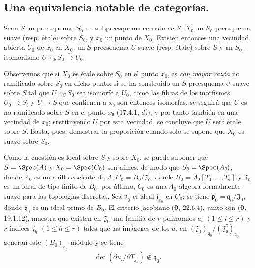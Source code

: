 \subsection{Una equivalencia notable de categorías.}
\label{subsection:IV.18.1}

\begin{proposition}[18.1.1]
\label{IV.18.1.1}
Sean $S$ un preesquema, $S_0$ un subpreesquema cerrado de $S$, $X_0$ un $S_0$-preesquema suave \textup{(resp.} étale\textup{)} sobre $S_0$, y $x_0$ un punto de $X_0$. Existen entonces una vecindad abierta $U_0$ de $x_0$ en $X_0$, un $S$-preesquema $U$ suave \textup{(resp.} étale\textup{)} sobre $S$ y un $S_0$-isomorfismo
$U\times_S S_0\xrightarrow{\sim}U_0$.
\end{proposition}

Observemos que si $X_0$ es étale sobre $S_0$ en el punto $x_0$, es \emph{con mayor razón} no ramificado sobre $S_0$ en dicho punto; si se ha construido un $S$-preesquema $U$ suave sobre $S$ tal que $U\times_S S_0$ sea isomorfo a $U_0$, como las fibras de los morfismos $U_0\to S_0$ y $U\to S$ que contienen a $x_0$ son entonces isomorfas, se seguirá que $U$ es no ramificado sobre $S$ en el punto $x_0$ (17.4.1, \emph{d)}), y por tanto también en una vecindad de $x_0$; sustituyendo $U$ por esta vecindad, se concluye que $U$ será étale sobre $S$. Basta, pues, demostrar la proposición cuando solo se supone que $X_0$ es suave sobre $S_0$.

Como la cuestión es local sobre $S$ y sobre $X_0$, se puede suponer que $S=\Spec(A)$ y $X_0=\Spec(C_0)$ son afines, de modo que $S_0=\Spec(A_0)$, donde $A_0$ es un anillo cociente de $A$, $C_0=B_0/\mathfrak J_0$, donde $B_0=A_0[T_1,\ldots,T_n]$ y $\mathfrak J_0$ es un ideal de tipo finito de $B_0$; por último, $C_0$ es una $A_0$-álgebra formalmente suave para las topologías discretas. Sea $\mathfrak p_0$ el ideal $\mathfrak j_{x_0}$ en $C_0$; se tiene $\mathfrak p_0=\mathfrak q_0/\mathfrak J_0$, donde $\mathfrak q_0$ es un ideal primo de $B_0$. El criterio jacobiano (\textbf 0, 22.6.4), junto con (\textbf 0, 19.1.12), muestra que existen en $\mathfrak J_0$ una familia de $r$ polinomios $u_i$ $(1\leq i\leq r)$ y $r$ índices $j_h$ $(1\leq h\leq r)$ tales que las imágenes de los $u_i$ en $(\mathfrak J_0)_{\mathfrak q_0}/(\mathfrak J_0^2)_{\mathfrak q_0}$ generan este $(B_0)_{\mathfrak q_0}$-módulo y se tiene
\begin{equation}
  \det(\partial u_i/\partial T_{j_h})\notin\mathfrak q_0.
  \tag{18.1.1.1}\label{IV.18.1.1.1}
\end{equation}

